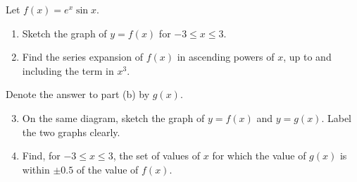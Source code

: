 \begin{problem}
    Let $f(x) = e^x \sin x$.

    \begin{enumerate}
        \item Sketch the graph of $y = f(x)$ for $-3 \leq x \leq 3$.
        \item Find the series expansion of $f(x)$ in ascending powers of $x$, up to and including the term in $x^3$.
    \end{enumerate}

    Denote the answer to part (b) by $g(x)$.

    \begin{enumerate}
        \setcounter{enumi}{2}
        \item On the same diagram, sketch the graph of $y = f(x)$ and $y = g(x)$. Label the two graphs clearly.
        \item Find, for $-3 \leq x \leq 3$, the set of values of $x$ for which the value of $g(x)$ is within $\pm 0.5$ of the value of $f(x)$.
    \end{enumerate}
\end{problem}
\clearpage
